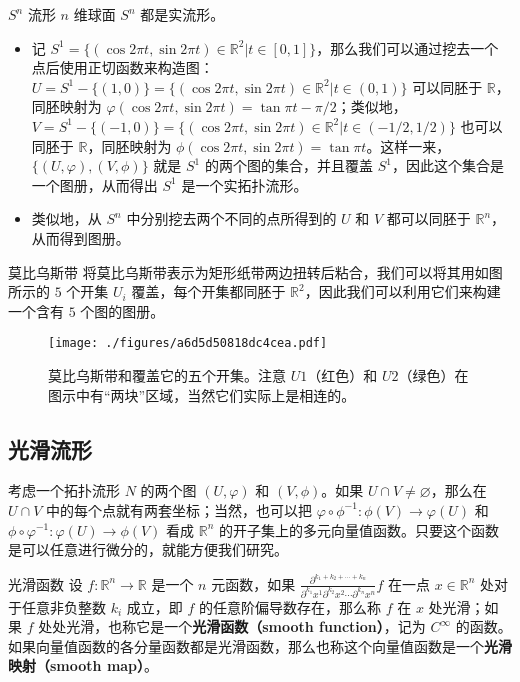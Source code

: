 \begin{example}{$S^n$ 流形}
$n$ 维球面 $S^n$ 都是实流形。
\begin{itemize}
\item 记 $S^1=\{(\cos{2\pi t},\sin{2\pi t})\in\mathbb{R}^2|t\in[0, 1]\}$，那么我们可以通过挖去一个点后使用正切函数来构造图：$U=S^1-\{(1,0)\}=\{(\cos{2\pi t},\sin{2\pi t})\in\mathbb{R}^2|t\in(0, 1)\}$ 可以同胚于 $\mathbb{R}$，同胚映射为 $\varphi(\cos{2\pi t},\sin{2\pi t})=\tan{\pi t-\pi/2}$；类似地，$V=S^1-\{(-1, 0)\}=\{(\cos{2\pi t},\sin{2\pi t})\in\mathbb{R}^2|t\in(-1/2, 1/2)\}$ 也可以同胚于 $\mathbb{R}$，同胚映射为 $\phi(\cos{2\pi t},\sin{2\pi t})= \tan{\pi t}$。这样一来，$\{(U, \varphi), (V, \phi)\}$ 就是 $S^1$ 的两个图的集合，并且覆盖 $S^1$，因此这个集合是一个图册，从而得出 $S^1$ 是一个实拓扑流形。
\item 类似地，从 $S^n$ 中分别挖去两个不同的点所得到的 $U$ 和 $V$ 都可以同胚于 $\mathbb{R}^n$，从而得到图册。


\end{itemize}

\end{example}

\begin{example}{莫比乌斯带}
将莫比乌斯带表示为矩形纸带两边扭转后粘合，我们可以将其用如图所示的 $5$ 个开集 $U_i$ 覆盖，每个开集都同胚于 $\mathbb{R}^2$，因此我们可以利用它们来构建一个含有 $5$ 个图的图册。
\begin{figure}[ht]
\centering
\texttt{[image: ./figures/a6d5d50818dc4cea.pdf]}
\caption{莫比乌斯带和覆盖它的五个开集。注意 $U1$（红色）和 $U2$（绿色）在图示中有“两块”区域，当然它们实际上是相连的。} \label{fig_Manif_1}
\end{figure}
\end{example}

\subsection{光滑流形}

考虑一个拓扑流形 $N$ 的两个图 $(U, \varphi)$ 和 $(V, \phi)$。如果 $U\cap V\not=\varnothing$，那么在 $U\cap V$ 中的每个点就有两套坐标；当然，也可以把 $\varphi\circ\phi^{-1}:\phi(V)\rightarrow\varphi(U)$ 和 $\phi\circ\varphi^{-1}:\varphi(U)\rightarrow\phi(V)$ 看成 $\mathbb{R}^n$ 的开子集上的多元向量值函数。只要这个函数是可以任意进行微分的，就能方便我们研究。

\begin{definition}{光滑函数}
设 $f:\mathbb{R}^n\rightarrow\mathbb{R}$ 是一个 $n$ 元函数，如果 $\frac{\partial^{k_1+k_2+\cdots+k_n}}{\partial^{k_1}x^1\partial^{k_2}x^2\cdots\partial^{k_n}x^n} f$ 在一点 $x\in\mathbb{R}^n$ 处对于任意非负整数 $k_i$ 成立，即 $f$ 的任意阶偏导数存在，那么称 $f$ 在 $x$ 处光滑；如果 $f$ 处处光滑，也称它是一个\textbf{光滑函数（smooth function）}，记为 $C^\infty$ 的函数。如果向量值函数的各分量函数都是光滑函数，那么也称这个向量值函数是一个\textbf{光滑映射（smooth map）}。
\end{definition}

